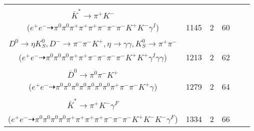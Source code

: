 \documentclass[landscape]{article}
\newcounter{rownumbers}
\newcommand\rn{\stepcounter{rownumbers}\arabic{rownumbers}}
\newcommand{\EOLP}{\\ \hline} %
\newcommand{\topoTags}[1]{#1} %
\begin{document}
\begin{longtable}{clcccc}
\rn & \makecell[l]{ $ 
e^{+} e^{-} \rightarrow \pi^{-} D^{*+} \bar{D}^{*0} \gamma^{I} ,
D^{*+} \rightarrow \pi^{+} D^{0} ,
\bar{D}^{*0} \rightarrow \pi^{0} \bar{D}^{0} ,
D^{0} \rightarrow \pi^{+} K_{1}^{-} ,
\bar{D}^{0} \rightarrow \pi^{0} \pi^{-} K^{+} ,
K_{1}^{-} \rightarrow \pi^{-} \bar{K}^{*} ,
$ \\ $
\bar{K}^{*} \rightarrow \pi^{+} K^{-} 
$ \\ ($
e^{+} e^{-} \dashrightarrow \pi^{0} \pi^{0} \pi^{+} \pi^{+} \pi^{+} \pi^{-} \pi^{-} \pi^{-} K^{+} K^{-} \gamma^{I} 
$) } & \topoTags{1145 & }2 & 60 \EOLP

\rn & \makecell[l]{ $ 
e^{+} e^{-} \rightarrow \bar{K}^{0} K^{*} D^{*+} D^{*-} \gamma^{I} ,
\bar{K}^{0} \rightarrow K_{S}^{0} ,
K^{*} \rightarrow \pi^{-} K^{+} ,
D^{*+} \rightarrow \pi^{+} D^{0} ,
D^{*-} \rightarrow \pi^{0} D^{-} ,
K_{S}^{0} \rightarrow \pi^{0} \pi^{0} ,
$ \\ $
D^{0} \rightarrow \eta K_{S}^{0} ,
D^{-} \rightarrow \pi^{-} \pi^{-} K^{+} ,
\eta \rightarrow \gamma \gamma ,
K_{S}^{0} \rightarrow \pi^{+} \pi^{-} 
$ \\ ($
e^{+} e^{-} \dashrightarrow \pi^{0} \pi^{0} \pi^{0} \pi^{+} \pi^{+} \pi^{-} \pi^{-} \pi^{-} \pi^{-} K^{+} K^{+} \gamma^{I} \gamma \gamma 
$) } & \topoTags{1213 & }2 & 62 \EOLP

\rn & \makecell[l]{ $ 
e^{+} e^{-} \rightarrow \pi^{0} \pi^{-} D^{*+} \bar{D}_{2}^{*0} ,
D^{*+} \rightarrow \pi^{+} D^{0} ,
\bar{D}_{2}^{*0} \rightarrow \pi^{0} \bar{D}^{*0} ,
D^{0} \rightarrow \pi^{0} K_{L}^{0} ,
\bar{D}^{*0} \rightarrow \bar{D}^{0} \gamma ,
K_{L}^{0} \rightarrow \pi^{0} \pi^{0} \pi^{0} ,
$ \\ $
\bar{D}^{0} \rightarrow \pi^{0} \pi^{-} K^{+} 
$ \\ ($
e^{+} e^{-} \dashrightarrow \pi^{0} \pi^{0} \pi^{0} \pi^{0} \pi^{0} \pi^{0} \pi^{0} \pi^{+} \pi^{-} \pi^{-} K^{+} \gamma 
$) } & \topoTags{1279 & }2 & 64 \EOLP

\rn & \makecell[l]{ $ 
e^{+} e^{-} \rightarrow \pi^{+} \pi^{-} K^{+} K^{-} D^{*0} \bar{D}^{*0} ,
D^{*0} \rightarrow \pi^{0} D^{0} ,
\bar{D}^{*0} \rightarrow \pi^{0} \bar{D}^{0} ,
D^{0} \rightarrow \rho^{0} \bar{K}^{*} ,
\bar{D}^{0} \rightarrow \pi^{0} \pi^{0} \pi^{+} \pi^{-} ,
\rho^{0} \rightarrow \pi^{+} \pi^{-} ,
$ \\ $
\bar{K}^{*} \rightarrow \pi^{+} K^{-} \gamma^{F} 
$ \\ ($
e^{+} e^{-} \dashrightarrow \pi^{0} \pi^{0} \pi^{0} \pi^{0} \pi^{+} \pi^{+} \pi^{+} \pi^{+} \pi^{-} \pi^{-} \pi^{-} K^{+} K^{-} K^{-} \gamma^{F} 
$) } & \topoTags{1334 & }2 & 66 \EOLP


\end{longtable}
\end{document}
